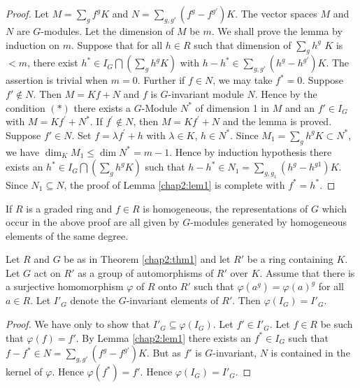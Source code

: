  \begin{proof}
Let $M=\sum\limits_{g}f^g K$ and $N= \sum\limits_{g,g'}
   (f^g - f^{g'}) K$. The  vector spaces  $M$ and $N$  are
   $G$-modules. Let  the  dimension of $M$ be $m$. We  shall prove the
   lemma  by induction on $m$. Suppose  that  for all  $h \in R$ such
   that  dimension of  $\sum\limits_{g} h^g$ $K$ is  $< m$, there
   exist  $h^\ast \in I_G \bigcap (\sum\limits_{g} h^g K)$  with
   $h-h^\ast \in \sum\limits_{g,g'} (h^g-h^{g'}) K$. The  assertion  is
   trivial when  $m=0$. Further if  $f \in N$, we may take  $f^\ast
   =0$. Suppose  $f' \notin N$. Then $M = Kf+N$ and  $f$ is  $G$-invariant
   module $N$. Hence  by the  condition $(\ast)$ there  exists  a
   $G$-Module  $N^\ast$ of dimension 1 in $M$ and an $f' \in I_G$
   \pageoriginale with $M = K f^\prime + N^ \ast$. If  $f^\prime
   \notin  N$, then 
   $M=Kf^\prime +N$ and the  lemma  is proved. Suppose  $f'
   \in  N$. Set  $f= \lambda f^\prime + h$ with  $\lambda \in K$,
   $h  \in N^\ast$. Since  $ M_{1} = \sum\limits_{g} h^g K \subset
   N^{\ast}$,  we  have  $\dim_K M_1\leqslant \dim
   N^{\ast}=m-1$. Hence  by  induction  hypothesis  there  exists  an
   $ h^{\ast}\in  I_G \bigcap (\sum\limits_{g} h^g K)$ such  that
   $h- h^{\ast} \in N_{1} =\sum\limits_{g,g_1}(h^g-h^{g1}) K$. Since
   $N_{1}\subseteq N $, the  proof of Lemma \ref{chap2:lem1}  is complete with
   $f^{\ast}= h^{\ast}$.  
 \end{proof}

\begin{remark*}
 If $R$  is a graded  ring  and   $f\in R$ is homogeneous, the
 representations  of $G$  which  occur in the  above  proof  are all
 given  by  $G$-modules generated by  homogeneous  elements of the
 same  degree. 
\end{remark*}

\setcounter{proposition}{0}
\begin{proposition}\label{chap2:prop1}%
 Let  $R$ and  $G$ be as in Theorem \ref{chap2:thm1} and  let  $R'$ be a ring
 containing $K$. Let $G$ act  on $R'$ as a group of automorphisms of
 $R'$ over $K$. Assume  that there  is a surjective  homomorphism
 $\varphi$ of  $R$ onto  $R'$ such  that  $\varphi (a^g)=\varphi
 (a)^g$ for all $a \in R$. Let  $I'_G$  denote  the $G$-invariant
 elements of $R'$. Then  $ \varphi (I_G)=I'_G$. 
\end{proposition}

\begin{proof}
 We  have only to show  that $I'_G \subseteq \varphi (I_G)$. Let  $f'
 \in I'_G$. Let  $f \in R$  be such  that $\varphi(f)=f'$. By  Lemma
 \ref{chap2:lem1} there  exists  an $f^\ast \in  I_G$ such  that  $f-
 f^\ast  \in  N= 
 \sum\limits_{g,g'} (f^g -f^{g'})K$. But  as  $f'$  is $G$-invariant,
 $N$ is  contained  in the  kernel  of $\varphi$. Hence $\varphi
 (f^\ast)= f'$. Hence $\varphi(I_G)=I'_G$. 
\end{proof}


